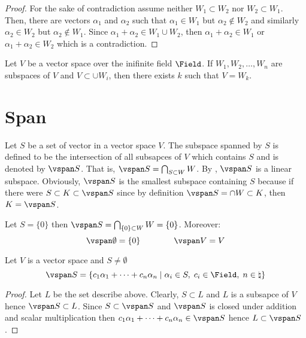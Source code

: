\begin{proof}
    For the sake of contradiction assume neither \(W_1 \subset W_2\) nor \(W_2 \subset W_1\). Then, there are vectors \(\alpha_1\) and \(\alpha_2\) such that \(\alpha_1 \in W_1\) but \(\alpha_2 \notin W_2\) and similarly \(\alpha_2 \in W_2\) but \(\alpha_2 \notin W_1\). Since \(\alpha_1 + \alpha_2 \in W_1 \cup W_2\), then \(\alpha_1 + \alpha_2 \in W_1\) or \(\alpha_1 + \alpha_2 \in W_2\) which is a contradiction.
\end{proof}

\begin{theorem}
    Let \(V\) be a vector space over the inifinite field \(\Field\). If \(W_1,W_2,\dots, W_n\) are subspaces of \(V\) and \(V \subset \cup W_i\), then there exists \(k\) such that \(V = W_k\).
\end{theorem}

\section{Span}

\begin{definition}
    Let \(S\) be a set of vector in a vector space \(V\). The subspace spanned by \(S\) is defined to be the intersection of all subsapces of \(V\) which contains \(S\) and is denoted by \(\vspan S\). That is, \(\vspan S = \bigcap_{S \subset W} W \). By , \(\vspan S\) is a linear subspace. Obviously, \(\vspan S\) is the smallest subspace containing \(S\) because if there were \(S \subset K \subset \vspan S\) since by definition \(\vspan S = \cap W \subset K\), then \(K = \vspan S\).
\end{definition}

\begin{example}
    Let \(S = \{0\}\) then \(\vspan S =  \bigcap_{\{0\} \subset W} W = \{0\}\). Moreover:
    \begin{equation*}
        \vspan \emptyset = \{0\} \qquad \qquad \vspan V = V
    \end{equation*}
\end{example}

\begin{theorem}
    Let \(V\) is a vector space and \( S \neq \emptyset\)
    \begin{equation*}
        \vspan S = \left \{ c_1 \alpha_1 + \dots + c_n \alpha_n \; \middle| \; \alpha_i \in S, \; c_i \in \Field, \; n \in \natural \right \}
    \end{equation*}
\end{theorem}

\begin{proof}
    Let \(L\) be the set describe above. Clearly, \(S \subset L\) and \(L\) is a subsapce of \(V\) hence \(\vspan S \subset L\). Since \(S \subset \vspan S\) and \(\vspan S\) is closed under addition and scalar multiplication then \( c_1 \alpha_1 + \dots + c_n \alpha_n \in \vspan S\) hence \(L \subset \vspan S\).
\end{proof}